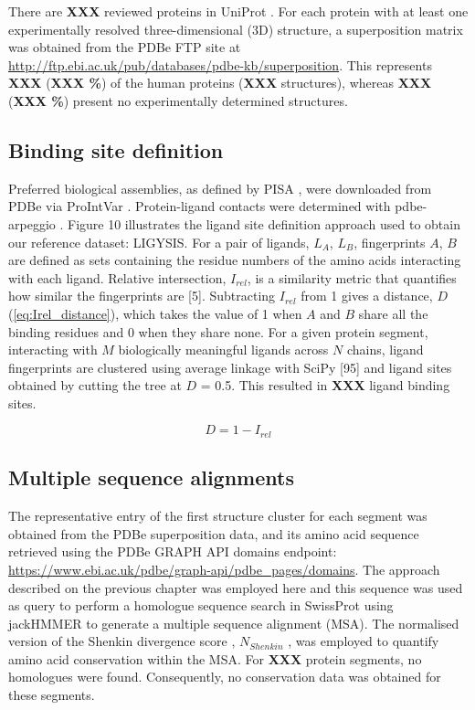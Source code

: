 There are \textbf{XXX} reviewed proteins in UniProt \cite{UNIPROT_2019_UNIPROT}. For each protein with at least one experimentally resolved three-dimensional (3D) structure, a superposition matrix was obtained from the PDBe FTP site \cite{PDBE_2022_PDBEKB} at \url{http://ftp.ebi.ac.uk/pub/databases/pdbe-kb/superposition}. This represents \textbf{XXX} (\textbf{XXX \%}) of the human proteins (\textbf{XXX} structures), whereas \textbf{XXX} (\textbf{XXX \%}) present no experimentally determined structures. 

\subsection{Binding site definition}

Preferred biological assemblies, as defined by PISA \cite{KRISSINEL_2007_PISA}, were downloaded from PDBe via ProIntVar \cite{MACGOWAN_2020_DRSASP}. Protein-ligand contacts were determined with pdbe-arpeggio \cite{JUBB_2017_ARPEGGIO}. Figure 10 illustrates the ligand site definition approach used to obtain our reference dataset: LIGYSIS. For a pair of ligands, $L_{A}$, $L_{B}$, fingerprints $A$, $B$ are defined as sets containing the residue numbers of the amino acids interacting with each ligand. Relative intersection, $I_{rel}$, is a similarity metric that quantifies how similar the fingerprints are [5]. Subtracting $I_{rel}$ from 1 gives a distance, $D$ (\autoref{eq:Irel_distance}), which takes the value of 1 when $A$ and $B$ share all the binding residues and 0 when they share none. For a given protein segment, interacting with $M$ biologically meaningful ligands across $N$ chains, ligand fingerprints are clustered using average linkage with SciPy [95] and ligand sites obtained by cutting the tree at $D$ = 0.5. This resulted in \textbf{XXX} ligand binding sites.

\begin{equation}
D = 1 - I_{rel}
\label{eq:Irel_distance}
\end{equation}

\subsection{Multiple sequence alignments}

The representative entry of the first structure cluster for each segment was obtained from the PDBe superposition data, and its amino acid sequence retrieved using the PDBe GRAPH API domains endpoint: \url{https://www.ebi.ac.uk/pdbe/graph-api/pdbe_pages/domains}. The approach described on the previous chapter was employed here and this sequence was used as query to perform a homologue sequence search in SwissProt \cite{BOUTET_2016_UNIPROT} using jackHMMER \cite{EDDY_1995_HMMER} to generate a multiple sequence alignment (MSA). The normalised version of the Shenkin divergence score \cite{SHENKIN_1991_SCORE}, $N_{Shenkin}$ \cite{UTGES_2021_ANKS}, was employed to quantify amino acid conservation within the MSA. For \textbf{XXX} protein segments, no homologues were found. Consequently, no conservation data was obtained for these segments. 

